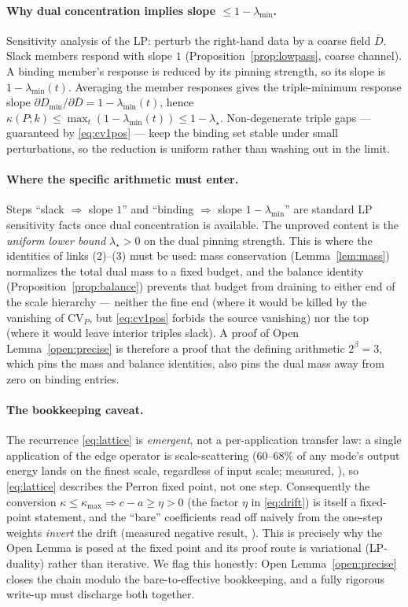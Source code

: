 \documentclass[11pt]{article}
\theoremstyle{definition}
\theoremstyle{remark}
\newcommand{\CV}{\mathrm{CV}}
\newcommand{\lam}{\lambda}
\newcommand{\bet}{\beta}
\newcommand{\kap}{\kappa}
\begin{document}
\paragraph{Why dual concentration implies slope $\leq 1 - \lam_{\min}$.}
Sensitivity analysis of the LP: perturb the right-hand data by a coarse field
$\bar D$. Slack members respond with slope $1$ (Proposition~\ref{prop:lowpass},
coarse channel). A binding member's response is reduced by its pinning strength,
so its slope is $1 - \lam_{\min}(t)$. Averaging the member responses gives the
triple-minimum response slope
$\partial D_{\min}/\partial \bar D = 1 - \lam_{\min}(t)$, hence
$\kap(P;k) \leq \max_t (1 - \lam_{\min}(t)) \leq 1 - \lam_\star$. Non-degenerate
triple gaps --- guaranteed by \eqref{eq:cv1pos} --- keep the binding set stable
under small perturbations, so the reduction is uniform rather than washing out
in the limit.

\paragraph{Where the specific arithmetic must enter.}
Steps ``slack $\Rightarrow$ slope $1$'' and ``binding $\Rightarrow$ slope
$1 - \lam_{\min}$'' are standard LP sensitivity facts once dual concentration is
available. The unproved content is the \emph{uniform lower bound}
$\lam_\star > 0$ on the dual pinning strength. This is where the identities of
links (2)--(3) must be used: mass conservation (Lemma~\ref{lem:mass}) normalizes
the total dual mass to a fixed budget, and the balance identity
(Proposition~\ref{prop:balance}) prevents that budget from draining to either
end of the scale hierarchy --- neither the fine end (where it would be killed by
the vanishing of $\CV_P$, but \eqref{eq:cv1pos} forbids the source vanishing)
nor the top (where it would leave interior triples slack). A proof of Open
Lemma~\ref{open:precise} is therefore a proof that the defining arithmetic
$2^{\bet} = 3$, which pins the mass and balance identities, also pins the dual
mass away from zero on binding entries.

\paragraph{The bookkeeping caveat.}
The recurrence \eqref{eq:lattice} is \emph{emergent}, not a per-application
transfer law: a single application of the edge operator is scale-scattering
(60--68\% of any mode's output energy lands on the finest scale, regardless of
input scale; measured, \cite{Drift26}), so \eqref{eq:lattice} describes the
Perron fixed point, not one step. Consequently the conversion
$\kap \leq \kap_{\max} \Rightarrow c - a \geq \eta > 0$ (the factor $\eta$ in
\eqref{eq:drift}) is itself a fixed-point statement, and the ``bare''
coefficients read off naively from the one-step weights \emph{invert} the drift
(measured negative result, \cite{Drift26}). This is precisely why the Open
Lemma is posed at the fixed point and its proof route is variational
(LP-duality) rather than iterative. We flag this honestly: Open
Lemma~\ref{open:precise} closes the chain modulo the bare-to-effective
bookkeeping, and a fully rigorous write-up must discharge both together.
\end{document}
